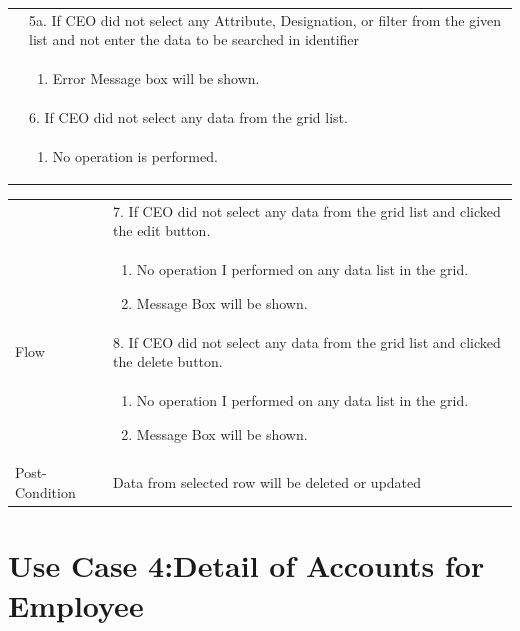 \documentclass[12pt,a4paper]{report}
\begin{document}
\begin{tabular}{ | m{3cm} | m{12cm}| }
& 5a. If CEO did not select any Attribute, Designation, or filter from the given list and not enter the data to be searched in identifier \\
& \begin{enumerate}
		\item Error Message box will be shown.
	\end{enumerate}
\\  
& 6. If CEO did not select any data from the grid list.  \\
& \begin{enumerate}
		\item No operation is performed.
	\end{enumerate}
\\ \hline  
\end{tabular}

\begin{tabular}{ | m{3cm} | m{12cm}| } \hline 
& 7. If CEO did not select any data from the grid list and clicked the edit button.\\
& \begin{enumerate}
		\item No operation I performed on any data list in the grid.
            \item Message Box will be shown.
	\end{enumerate}
\\
Flow       & 8. If CEO did not select any data from the grid list and clicked the delete button.\\
 	&\begin{enumerate}
			\item No operation I performed on any data list in the grid.
            \item Message Box will be shown.
	\end{enumerate}
\\ \hline 


Post-Condition &  Data from selected row will be deleted or updated  \\ \hline

\end{tabular}
\section{Use Case 4:Detail of Accounts for Employee }
\end{document}
